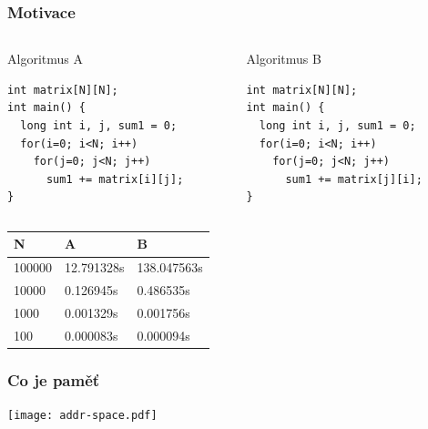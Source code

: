 \documentclass{beamer}
\begin{document}
\begin{frame}[fragile]
\frametitle{Motivace}

\begin{columns}
\begin{column}{0.45\textwidth}
Algoritmus A\\
\begin{verbatim}
int matrix[N][N];
int main() {
  long int i, j, sum1 = 0;
  for(i=0; i<N; i++)
    for(j=0; j<N; j++)
      sum1 += matrix[i][j];
}
\end{verbatim}
\end{column}
\hfill
\begin{column}{0.45\textwidth}
Algoritmus B\\
\begin{verbatim}
int matrix[N][N];
int main() {
  long int i, j, sum1 = 0;
  for(i=0; i<N; i++)
    for(j=0; j<N; j++)
      sum1 += matrix[j][i];
}
\end{verbatim}
\end{column}
\end{columns}
\bigskip

\begin{tabular}{|l|l|l|}\hline
N & A & B \\\hline
100000 & 12.791328s &138.047563s \\\hline
10000 & 0.126945s &0.486535s \\\hline
1000 & 0.001329s &0.001756s \\\hline
100 & 0.000083s &0.000094s \\\hline
\end{tabular}
\end{frame}

\begin{frame}
\frametitle{Co je paměť}

\centering

\texttt{[image: addr-space.pdf]}

\end{frame}
\end{document}
